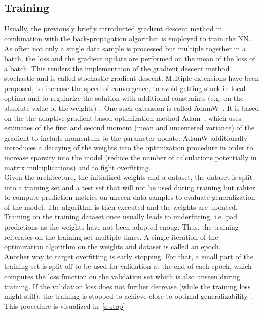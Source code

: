\subsection{Training}
Usually, the previously briefly introducted gradient descent method in combination with the back-propagation algorithm is employed to train the NN.
As often not only a single data sample is processed but multiple together in a batch, the loss and the gradient update are performed on the mean of the loss of a batch.
This renders the implementaion of the gradient descent method stochastic and is called stochastic gradient descent.
Multiple extensions have been proposed, to increase the speed of convergence, to avoid getting stuck in local optima and to regularize the solution with additional constraints (e.g. on the absolute value of the weights)~\autocite{ruder_overview_2017}.
One such extension is called AdamW~\autocite{loshchilov_decoupled_2019}.
It is based on the the adaptive gradient-based optimization method Adam~\autocite{kingma_adam_2017}, which uses estimates of the first and second moment (mean and uncentered variance) of the gradient to include momentum to the parameter update.
AdamW additionally introduces a decaying of the weights into the optimization procedure in order to increase sparsity into the model (reduce the number of calculations potentially in matrix multiplications) and to fight overfitting. \\

Given the architecture, the initialized weights and a dataset, the dataset is split into a training set and a test set that will not be used during training but rahter to compute prediction metrics on unseen data samples to evaluate generalization of the model.
The algorithm is then executed and the weights  are updated.
Training on the training dataset once usually leads to underfitting, i.e. pad predictions as the weights have not been adapted enoug.
Thus, the training reiterates on the training set multiple times.
A single iteration of the optimization algorithm on the weights and dataset is called an epoch. \\

Another way to target overfitting is early stopping.
For that, a small part of the training set is split off to be used for validation at the end of each epoch, which computes the loss function on the validation set which is also unseen during training.
If the validation loss does not further decrease (while the training loss might still), the training is stopped to achieve close-to-optimal generalizability~\autocite{raskutti_early_2013, gencay_pricing_2001}.
This procedure is visualized in~\ref{e-stop}

